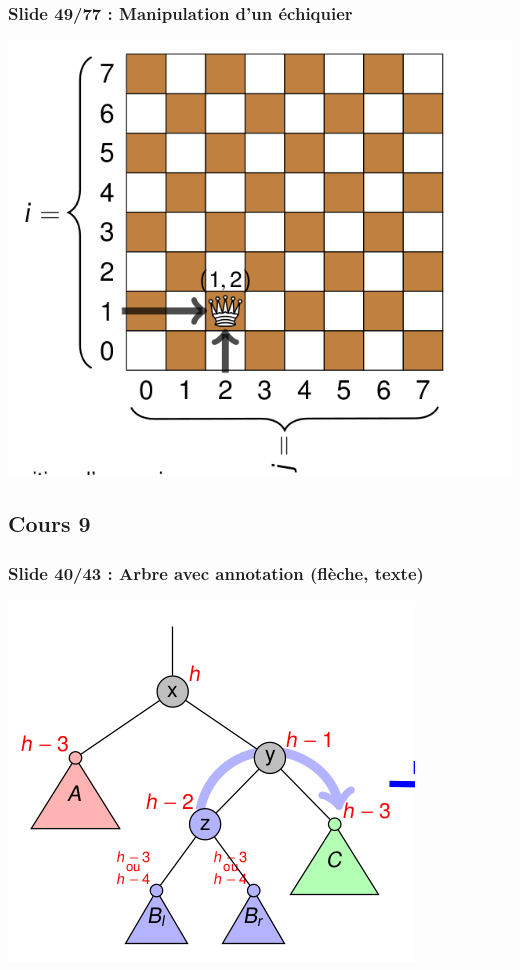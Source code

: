 \documentclass[12pt, a4paper]{article}
\begin{document}
\subsubsection{Slide 49/77 : Manipulation d'un échiquier}
\begin{center}
\includegraphics[scale=0.3]{images/INFO-H304_C7_3}
\end{center}
\subsection{Cours 9}
\subsubsection{Slide 40/43 : Arbre avec annotation (flèche, texte)}
\begin{center}
\includegraphics[scale=0.3]{images/INFO-H304_C9_1}
\end{center}
\end{document}
